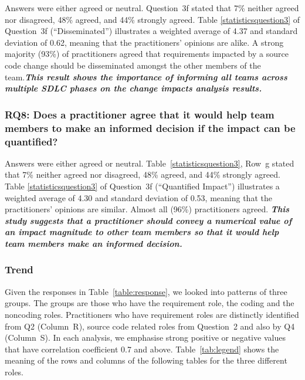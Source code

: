 \documentclass[conference]{IEEEtran}
\begin{document}
Answers were either agreed or neutral. Question~3f stated that 7\%
neither agreed nor disagreed, 48\% agreed, and 44\% strongly
agreed. Table \ref{statisticsquestion3} of Question~3f
(``Disseminated'') illustrates a weighted average of 4.37 and standard
deviation of 0.62, meaning that the practitioners' opinions are
alike. A strong majority (93\%) of practitioners agreed that
requirements impacted by a source code change should be disseminated
amongst the other members of the team.\textbf{\textit{This result
    shows the importance of informing all teams across multiple SDLC
    phases on the change impacts analysis results.}}

\subsubsection{RQ8: Does a practitioner agree that it would help team
  members to make an informed decision if the impact can be
  quantified?} 

Answers were either agreed or
neutral. Table~\ref{statisticsquestion3}, Row~g stated that 7\%
neither agreed nor disagreed, 48\% agreed, and 44\% strongly
agreed. Table \ref{statisticsquestion3} of Question~3f (``Quantified
Impact'') illustrates a weighted average of 4.30 and standard
deviation of 0.53, meaning that the practitioners' opinions are
similar. Almost all (96\%) practitioners agreed. \textbf{\textit{This
    study suggests that a practitioner should convey a numerical value
    of an impact magnitude to other team members so that it would help
    team members make an informed decision.}}

\subsubsection{Trend} 

Given the responses in Table~\ref{table:response}, we looked into
patterns of three groups. The groups are those who have the
requirement role, the coding and the noncoding roles. Practitioners
who have requirement roles are distinctly identified from Q2
(Column~R), source code related roles from Question~2 and also by Q4
(Column~S).  In each analysis, we emphasise strong positive or
negative values that have correlation coefficient 0.7 and
above. Table~\ref{tab:legend} shows the meaning of the rows and
columns of the following tables for the three different roles.
\end{document}
